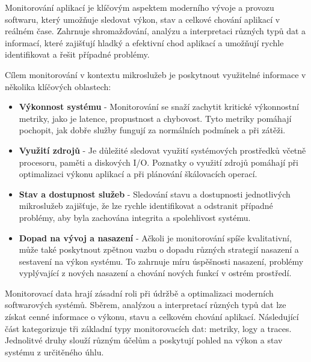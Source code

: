 


Monitorování aplikací je klíčovým aspektem moderního vývoje a provozu softwaru, který umožňuje sledovat výkon, stav a celkové chování aplikací v reálném čase. Zahrnuje shromažďování, analýzu a interpretaci různých typů dat a informací, které zajišťují hladký a efektivní chod aplikací a umožňují rychle identifikovat a řešit případné problémy.


Cílem monitorování v kontextu mikroslužeb je poskytnout využitelné informace v několika klíčových oblastech:

\begin {itemize}
    \item \textbf{Výkonnost systému} - Monitorování se snaží zachytit kritické výkonnostní metriky, jako je latence, propustnost a chybovost. Tyto metriky pomáhají pochopit, jak dobře služby fungují za normálních podmínek a při zátěži.
    \item \textbf{Využití zdrojů} - Je důležité sledovat využití systémových prostředků včetně procesoru, paměti a diskových I/O. Poznatky o využití zdrojů pomáhají při optimalizaci výkonu aplikací a při plánování škálovacích operací.
    \item \textbf{Stav a dostupnost služeb} - Sledování stavu a dostupnosti jednotlivých mikroslužeb zajišťuje, že lze rychle identifikovat a odstranit případné problémy, aby byla zachována integrita a spolehlivost systému.
    \item \textbf{Dopad na vývoj a nasazení} - Ačkoli je monitorování spíše kvalitativní, může také poskytnout zpětnou vazbu o dopadu různých strategií nasazení a sestavení na výkon systému. To zahrnuje míru úspěšnosti nasazení, problémy vyplývající z nových nasazení a chování nových funkcí v ostrém prostředí.
\end{itemize}


Monitorovací data hrají zásadní roli při údržbě a optimalizaci moderních softwarových systémů. Sběrem, analýzou a interpretací různých typů dat lze získat cenné informace o výkonu, stavu a celkovém chování aplikací. Následující část kategorizuje tři základní typy monitorovacích dat: metriky, logy a traces. Jednolitvé druhy slouží různým účelům a poskytují pohled na výkon a stav systému z určitěného úhlu.

